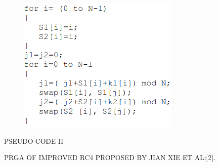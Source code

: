 \documentclass[conference]{IEEEtran}
\begin{document}
\begin{figure}[H]
    \centering
    \includegraphics[width=\linewidth]{psudocode1}
\end{figure}\newline \newline 



\centerline{PSEUDO CODE II} 

PRGA OF IMPROVED RC4 PROPOSED BY JIAN XIE ET AL:[2].
\end{document}
